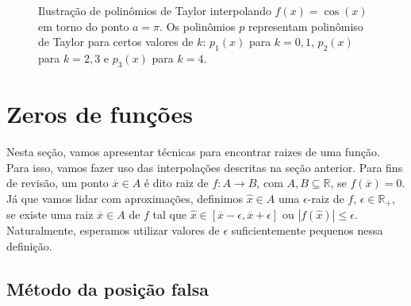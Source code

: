 \documentclass[]{article}
\numberwithin{equation}{section}
\begin{document}
\begin{figure}
  \centering
  \caption{Ilustração de polinômios de Taylor interpolando
    $f(x) =\cos(x)$ em torno do ponto $a = \pi$.  Os polinômios $p$
    representam polinômiso de Taylor para certos valores de $k$:
    $p_1(x)$ para $k = 0, 1$, $p_2(x)$ para $k = 2, 3$ e $p_3(x)$ para
    $k = 4$.}
\end{figure}

\section{Zeros de funções}

Nesta seção, vamos apresentar técnicas para encontrar raizes de uma
função. Para isso, vamos fazer uso das interpolações descritas na
seção anterior. Para fins de revisão, um ponto $\overline{x} \in A$ é
dito raiz de $f : A \to B$, com $A, B \subseteq \mathbb{R}$, se
$f(\overline{x}) = 0$. Já que vamos lidar com aproximações, definimos
$\hat{x} \in A$ uma $\epsilon$-raiz de $f$,
$\epsilon \in \mathbb{R}_+$, se existe uma raiz $\overline{x} \in A$
de $f$ tal que
$\hat{x} \in [\overline{x} - \epsilon, \overline{x} + \epsilon]$ ou
$|f(\hat{x})| \leq \epsilon$. Naturalmente, esperamos utilizar valores
de $\epsilon$ suficientemente pequenos nessa definição.

\subsection{Método da posição falsa}
\end{document}
